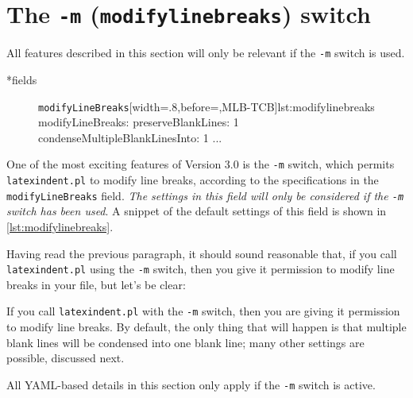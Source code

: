 \section{The \texttt{-m} (\texttt{modifylinebreaks}) switch}\label{sec:modifylinebreaks}
All features described in this section will only be relevant if the \texttt{-m} switch
is used.

*{fields}
\begin{figure}
\begin{yaml}[numbers=none]{\texttt{modifyLineBreaks}}[width=.8\linewidth,before=\centering,MLB-TCB]{lst:modifylinebreaks}
modifyLineBreaks:
    preserveBlankLines: 1
    condenseMultipleBlankLinesInto: 1
   ...
	\end{yaml}
  \end{figure}
%	
One of the most exciting features of Version 3.0 is the \texttt{-m} switch, which 
permits \texttt{latexindent.pl} to modify line breaks, according to the 
specifications in the \texttt{modifyLineBreaks} field. \emph{The settings 
in this field will only be considered if the \texttt{-m} switch has been used}.
A snippet of the default settings of this field is shown in \cref{lst:modifylinebreaks}.

Having read the previous paragraph, it should sound reasonable that, if you call \texttt{latexindent.pl}
using the \texttt{-m} switch, then you give it permission to modify line breaks in your file, 
but let's be clear:

\begin{warning}
  If you call \texttt{latexindent.pl} with the \texttt{-m} switch, then you 
  are giving it permission to modify line breaks. By default, the only 
  thing that will happen is that multiple blank lines will be condensed into 
  one blank line; many other settings are possible, discussed next.
\end{warning}
All YAML-based details in this section only apply if the \texttt{-m} switch is active.

